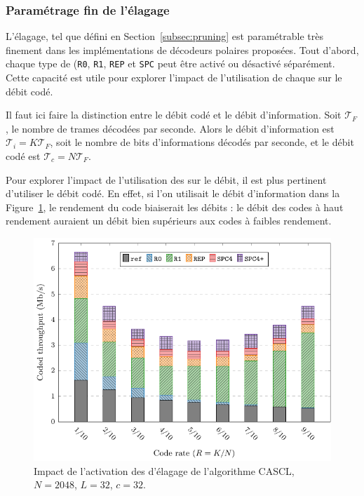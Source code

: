\subsubsection{Paramétrage fin de l'élagage}
L'élagage, tel que défini en Section~\ref{subsec:pruning} est paramétrable très finement dans les implémentations de décodeurs polaires proposées. Tout d'abord, chaque type de \noeud (\texttt{R0}, \texttt{R1}, \texttt{REP} et \texttt{SPC} peut être activé ou désactivé séparément. Cette capacité est utile pour explorer l'impact de l'utilisation de chaque \noeud sur le débit codé.

Il faut ici faire la distinction entre le débit codé  et le débit d'information. Soit $\mathcal{T}_F$, le nombre de trames décodées par seconde. Alors le débit d'information est $\mathcal{T}_i=K\mathcal{T}_F$, soit le nombre de bits d'informations décodés par seconde, et le débit codé est $\mathcal{T}_c=N\mathcal{T}_F$.

Pour explorer l'impact de l'utilisation des \noeuds sur le débit, il est  plus pertinent d'utiliser le débit codé. En effet, si l'on utilisait le débit d'information dans la Figure~\ref{fig:nodes}, le rendement du code biaiserait les débits : le débit des codes à haut rendement auraient un débit bien supérieurs aux codes à faibles rendement.
\begin{figure}[t]
\includegraphics[width=\textwidth]{main/ch2_fig/curves/tree/tikz/tree}
\caption{Impact de l'activation des \noeuds d'élagage de l'algorithme CASCL, $N=2048$, $L=32$, $c=32$.}
\label{fig:nodes}
\end{figure}

